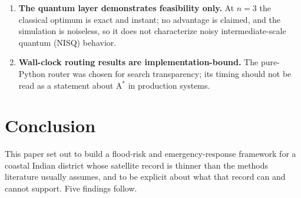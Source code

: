 \documentclass[10pt,twocolumn]{article}
\begin{document}
\begin{enumerate}
      Kannada. The geographic-transfer test moves across a city boundary, not
      across a climatic or geomorphic regime.
\item \textbf{The quantum layer demonstrates feasibility only.} At $n=3$ the
      classical optimum is exact and instant; no advantage is claimed, and the
      simulation is noiseless, so it does not characterize noisy intermediate-scale quantum (NISQ) behavior.
\item \textbf{Wall-clock routing results are implementation-bound.} The
      pure-Python router was chosen for search transparency; its timing should
      not be read as a statement about A$^\ast$ in production systems.
\end{enumerate}

\section{Conclusion}
\label{sec:conclusions}

This paper set out to build a flood-risk and emergency-response framework for a
coastal Indian district whose satellite record is thinner than the methods
literature usually assumes, and to be explicit about what that record can and
cannot support. Five findings follow.
\end{document}
